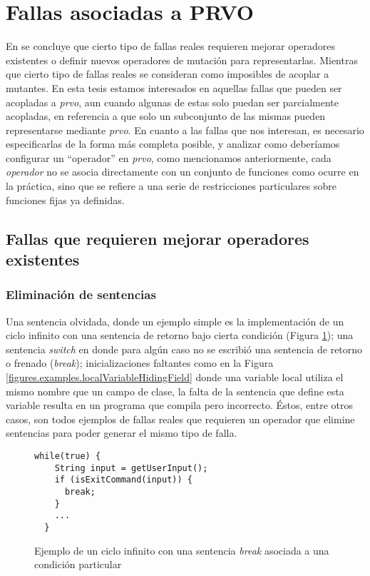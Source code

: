 \section{Fallas asociadas a PRVO}
\label{sec:prvo.prvoTargetedFaults}

En \cite{bibliography.mutation.evaluation.valid-substitute} se concluye que cierto tipo de fallas reales requieren mejorar operadores existentes o definir nuevos operadores de mutaci\'on para representarlas. Mientras que cierto tipo de fallas reales se consideran como imposibles de acoplar a mutantes. En esta tesis estamos interesados en aquellas fallas que pueden ser acopladas a \emph{prvo}, aun cuando algunas de estas solo puedan ser parcialmente acopladas, en referencia a que solo un subconjunto de las mismas pueden representarse mediante \emph{prvo}. En cuanto a las fallas que nos interesan, es necesario especificarlas de la forma m\'as completa posible, y analizar como deber\'iamos configurar un ``operador'' en \emph{prvo}, como mencionamos anteriormente, cada \emph{operador} no se asocia directamente con un conjunto de funciones como ocurre en la pr\'actica, sino que se refiere a una serie de restricciones particulares sobre funciones fijas ya definidas.

\subsection{Fallas que requieren mejorar operadores existentes}

\subsubsection{Eliminaci\'on de sentencias}

Una sentencia olvidada, donde un ejemplo simple es la implementaci\'on de un ciclo infinito con una sentencia de retorno bajo cierta condici\'on (Figura \ref{figures.examples.infCicle}); una sentencia \emph{switch} en donde para alg\'un caso no se escribi\'o una sentencia de retorno o frenado (\emph{break}); inicializaciones faltantes como en la Figura \ref{figures.examples.localVariableHidingField} donde una variable local utiliza el mismo nombre que un campo de clase, la falta de la sentencia que define esta variable resulta en un programa que compila pero incorrecto. \'Estos, entre otros casos, son todos ejemplos de fallas reales que requieren un operador que elimine sentencias para poder generar el mismo tipo de falla.

\begin{figure}
	\begin{lstlisting}[frame=single, mathescape=true,framexleftmargin=1.5em]
  while(true) {
    String input = getUserInput();
    if (isExitCommand(input)) {
      break;
    }
    ...
  }
	\end{lstlisting}
	\caption{Ejemplo de un ciclo infinito con una sentencia \emph{break} asociada a una condici\'on particular}
	\label{figures.examples.infCicle}
\end{figure}

